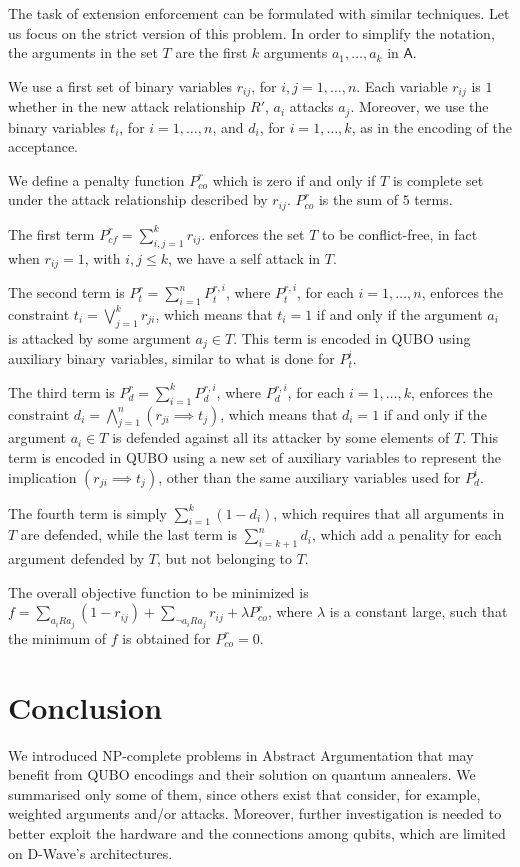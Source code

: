 \documentclass[conference,compsocconf]{IEEEtran}
\newcommand{\args}{\ensuremath{\mathsf{A}}\xspace} %
\newcommand{\atts}{\ensuremath{R}\xspace}
\begin{document}
The task of extension enforcement can be formulated with similar techniques.
Let us focus on the strict version of this problem. 
In order to simplify the notation, the arguments in the set $T$
are the first $k$ arguments $a_1,\dots,a_k$ in $\args$.

We use a first set of binary variables $r_{ij}$, for $i,j=1,\dots,n$.
Each variable $r_{ij}$ is $1$ whether in the new attack relationship 
$R'$, $a_i$ attacks $a_j$. Moreover, we use the binary variables $t_i$,
for $i=1,\dots,n$, and $d_i$, for $i=1,\dots,k$, as in the
encoding of the acceptance.

We define a penalty function $P^r_{co}$ which is zero if and only
if $T$ is complete set under the attack relationship described
by $r_{ij}$. $P^r_{co}$ is the sum of $5$ terms.

The first term 
$P^r_{cf}=\sum_{i,j=1}^k r_{ij}$. 
enforces the set $T$ to be conflict-free, in fact when $r_{ij}=1$,
with $i,j\le k$, we have a self attack in $T$.

The second term is $P^r_t=\sum_{i=1}^n P^{r,i}_{t}$, where 
$P^{r,i}_{t}$, for each $i=1,\dots,n$, enforces the constraint
$t_i=\bigvee_{j=1}^k r_{ji} $, which 
means that $t_i=1$ if and only if the argument $a_i$
is attacked by some argument $a_j\in T$. This term is encoded in QUBO using auxiliary binary variables, similar to what is done for
$P^i_t$.

The third term is $P^r_d=\sum_{i=1}^k P^{r,i}_{d}$, where $P^{r,i}_{d}$, for each $i=1,\dots,k$, enforces the constraint
$d_i=\bigwedge_{j=1}^n (r_{ji} \implies t_j)$,  which 
means that $d_i=1$ if and only if the argument $a_i\in T$
is defended against all its attacker by some elements of $T$.
This term is encoded in QUBO using a new set of auxiliary variables 
to represent the implication $(r_{ji} \implies t_j)$, other
than the same auxiliary variables used for $P^i_d$.

The fourth term is simply $\sum_{i=1}^k (1-d_i)$, which requires
that all arguments in $T$ are defended, while the last term
is $\sum_{i=k+1}^n d_i$, which add a penality for each argument defended by $T$, but not belonging to $T$.

The overall objective function to be minimized is
$f=\sum_{a_i \atts a_j} (1-r_{ij}) + \sum_{\neg a_i \atts a_j} r_{ij} + \lambda P^r_{co}$,
where $\lambda$ is a constant large, such that the minimum of $f$ is 
obtained for $P^r_{co}=0$.



\section{Conclusion}\label{sec:conclusion}
We introduced NP-complete problems in Abstract Argumentation that may benefit from QUBO encodings and their solution on quantum annealers. We summarised only some of them, since others exist  that consider, for example, weighted arguments and/or attacks. Moreover, further investigation is needed to better exploit the hardware and the connections among qubits, which are limited on D-Wave’s architectures.



\end{document}
